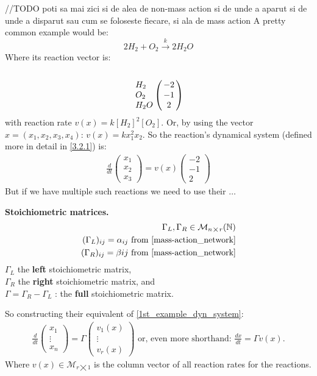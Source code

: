 \hfill\break
//TODO poti sa mai zici si de alea de non-mass action si de unde a aparut si de unde a disparut sau cum se foloseste fiecare, si ala de mass action
\hfill\break
A pretty common example would be:
\[
	2H_2 + O_2 \xrightarrow{k} 2H_2O
\]
Where its reaction vector is:
\[
	\bordermatrix{\cr \cr
		H_2 & -2 \cr
		O_2 & -1 \cr
		H_2O & 2 \cr
	}
\]
with reaction rate $v(x) = k[H_2]^2[O_2]$. Or, by using the vector $x=(x_1, x_2, x_3, x_4)$: $v(x) = k x_1^2 x_2$.
So the reaction's dynamical system (defined more in detail in \ref{3.2.1}) is:
\begin{align}\label{1st_example_dyn_system}
	\frac{d}{dt}
	\begin{pmatrix*}
		x_1 \\
		x_2 \\
		x_3
	\end{pmatrix*} =
	v(x)
	\begin{pmatrix}
		-2 \\
		-1 \\
		2
	\end{pmatrix}
\end{align}
But if we have multiple such reactions we need to use their $\ldots$
\begin{definition}
	\textbf{Stoichiometric matrices.}
	\begin{align*}
		\Gamma_L, \Gamma_R \in \mathcal{M}_{n \bigtimes r}(\mathbb{N}) \\
		(\Gamma_L)_{ij} = \alpha_{ij} \text{ from \ref{mass-action_network}} \\
		(\Gamma_R)_{ij} = \beta{ij} \text{ from \ref{mass-action_network}}
	\end{align*}
	$\Gamma_L$ the \textbf{left} stoichiometric matrix, \\
	$\Gamma_R$ the \textbf{right} stoichiometric matrix, and \\
	$\Gamma = \Gamma_R - \Gamma_L$ : the \textbf{full} stoichiometric matrix.
\end{definition}
So constructing their equivalent of \ref{1st_example_dyn_system}:
\begin{align}
	\frac{d}{dt}
	\begin{pmatrix*}
		x_1 \\
		\vdots \\
		x_n
	\end{pmatrix*} = \Gamma
	\begin{pmatrix*}
		v_1(x)	 \\
		\vdots \\
		v_r(x)
	\end{pmatrix*}
	\text{ or, even more shorthand:  }
	\frac{dx}{dt} = \Gamma v(x).
\end{align}
Where $v(x) \in \mathcal{M}_{r \bigtimes 1}$ is the column vector of all reaction rates for the reactions.


